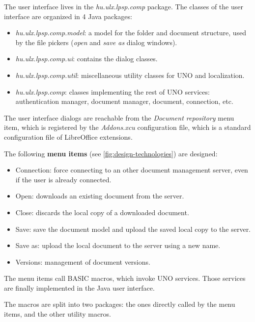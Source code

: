 The user interface lives in the \emph{hu.ulx.lpsp.comp} package. The classes of
the user interface are organized in 4 Java packages:

\begin{itemize}
\item \emph{hu.ulx.lpsp.comp.model}: a model for the folder and document
structure, used by the file pickers (\emph{open} and \emph{save as} dialog
windows).
\item \emph{hu.ulx.lpsp.comp.ui}: contains the dialog classes.
\item \emph{hu.ulx.lpsp.comp.util}: miscellaneous utility classes for UNO and localization.
\item \emph{hu.ulx.lpsp.comp}: classes implementing the rest of UNO
services: authentication manager, document manager, document, connection, etc.
\end{itemize}

The user interface dialogs are reachable from the \emph{Document repository}
menu item, which is registered by the \emph{Addons.xcu} configuration file,
which is a standard configuration file of LibreOffice extensions.


The following \textbf{menu items} (see \autoref{fig:design-technologies}) are designed:

\begin{itemize}
\item Connection: force connecting to an other document management server, even
if the user is already connected.
\item Open: downloads an existing document from the server.
\item Close: discards the local copy of a downloaded document.
\item Save: save the document model and upload the saved local copy to the server.
\item Save as: upload the local document to the server using a new name.
\item Versions: management of document versions.
\end{itemize}

The menu items call BASIC macros, which invoke UNO services. Those services are
finally implemented in the Java user interface.


The macros are split into two packages: the ones directly called by the menu
items, and the other utility macros.

